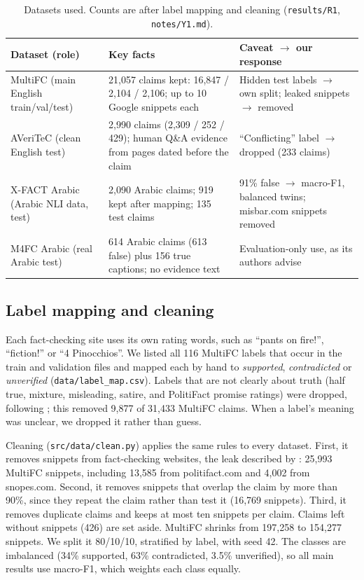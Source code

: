 \begin{table}[t]
\centering\small
\caption{Datasets used. Counts are after label mapping and cleaning (\texttt{results/R1}, \texttt{notes/Y1.md}).}
\label{tab:data}
\begin{tabularx}{\textwidth}{@{}l X X@{}}
\toprule
Dataset (role) & Key facts & Caveat $\rightarrow$ our response \\
\midrule
MultiFC (main English train/val/test) & 21,057 claims kept: 16,847 / 2,104 / 2,106; up to 10 Google snippets each & Hidden test labels $\rightarrow$ own split; leaked snippets $\rightarrow$ removed \\
AVeriTeC (clean English test) & 2,990 claims (2,309 / 252 / 429); human Q\&A evidence from pages dated before the claim & ``Conflicting'' label $\rightarrow$ dropped (233 claims) \\
X-FACT Arabic (Arabic NLI data, test) & 2,090 Arabic claims; 919 kept after mapping; 135 test claims & 91\% false $\rightarrow$ macro-F1, balanced twins; misbar.com snippets removed \\
M4FC Arabic (real Arabic test) & 614 Arabic claims (613 false) plus 156 true captions; no evidence text & Evaluation-only use, as its authors advise \\
\bottomrule
\end{tabularx}
\end{table}

\subsection{Label mapping and cleaning}
Each fact-checking site uses its own rating words, such as ``pants on fire!'', ``fiction!'' or ``4 Pinocchios''. We listed all 116 MultiFC labels that occur in the train and validation files and mapped each by hand to \emph{supported}, \emph{contradicted} or \emph{unverified} (\texttt{data/label\_map.csv}). Labels that are not clearly about truth (half true, mixture, misleading, satire, and PolitiFact promise ratings) were dropped, following \citet{hansen2021reason}; this removed 9,877 of 31,433 MultiFC claims. When a label's meaning was unclear, we dropped it rather than guess.

Cleaning (\texttt{src/data/clean.py}) applies the same rules to every dataset. First, it removes snippets from fact-checking websites, the leak described by \citet{glockner2022missing}: 25,993 MultiFC snippets, including 13,585 from politifact.com and 4,002 from snopes.com. Second, it removes snippets that overlap the claim by more than 90\%, since they repeat the claim rather than test it (16,769 snippets). Third, it removes duplicate claims and keeps at most ten snippets per claim. Claims left without snippets (426) are set aside. MultiFC shrinks from 197,258 to 154,277 snippets. We split it 80/10/10, stratified by label, with seed 42. The classes are imbalanced (34\% supported, 63\% contradicted, 3.5\% unverified), so all main results use macro-F1, which weights each class equally.

